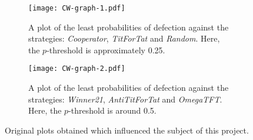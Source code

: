 \begin{figure}
    \centering
        \begin{subfigure}{0.45\textwidth}
            \centering
            \texttt{[image: CW-graph-1.pdf]}
            \caption{A plot of the least probabilities of defection against the strategies: \textit{Cooperator}, \textit{TitForTat} and \textit{Random}. Here, the \(p\)-threshold is approximately 0.25.}\label{fig:CW_graph_1}
        \end{subfigure}
        \hspace{3pt}
        \begin{subfigure}{0.45\textwidth}
            \centering
            \texttt{[image: CW-graph-2.pdf]}
            \caption{A plot of the least probabilities of defection against the strategies: \textit{Winner21}, \textit{AntiTitForTat} and \textit{OmegaTFT}. Here, the \(p\)-threshold is around 0.5.}\label{fig:CW_graph_2}
        \end{subfigure}
        \caption{Original plots obtained which influenced the subject of this project.}\label{fig:CW_plots}
\end{figure}

